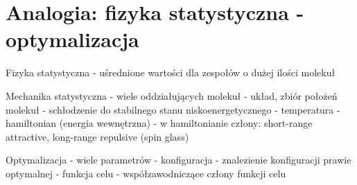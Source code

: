 \section{Analogia: fizyka statystyczna - optymalizacja}

Fizyka statystyczna - uśrednione wartości dla zespołów o dużej ilości molekuł

Mechanika statystyczna
- wiele oddziałujących molekuł
- układ, zbiór położeń molekuł 
- schłodzenie do stabilnego stanu niskoenergetycznego
- temperatura
- hamiltonian (energia wewnętrzna)
- w hamiltonianie człony: short-range attractive, long-range repulsive (spin glass)

Optymalizacja
- wiele parametrów
- konfiguracja
- znalezienie konfiguracji prawie optymalnej
- funkcja celu
- współzawodniczące człony funkcji celu
